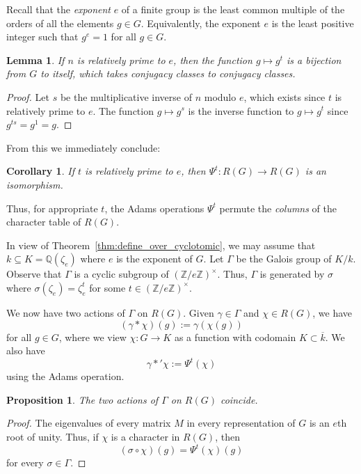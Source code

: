 \documentclass[12pt]{article}
\theoremstyle{plain}
\newtheorem{lemma}[theorem]{Lemma}
\newtheorem{proposition}[theorem]{Proposition}
\newtheorem{corollary}[theorem]{Corollary}
\theoremstyle{definition}
\theoremstyle{remark}
\numberwithin{equation}{section}
\begin{document}
Recall that the \emph{exponent} $e$ of a finite group is the least common multiple
of the orders of all the elements $g \in G$.
Equivalently, the exponent $e$ is the least positive integer such that
$g^e=1$ for all $g \in G$.

\begin{lemma}
If $n$ is relatively prime to $e$,
then the function $g \mapsto g^t$ is a bijection from $G$ to itself,
which takes conjugacy classes to conjugacy classes.
\end{lemma}

\begin{proof}
Let $s$ be the multiplicative inverse of $n$ modulo $e$,
which exists since $t$ is relatively prime to $e$.
The function $g \mapsto g^s$ is the inverse function to
$g \mapsto g^t$ since $g^{ts}=g^1=g$.
\end{proof}

From this we immediately conclude:

\begin{corollary}
If $t$ is relatively prime to $e$,
then $\Psi^t : R(G) \to R(G)$ is an isomorphism.
\end{corollary}

Thus, for appropriate $t$, the Adams operations $\Psi^t$
permute the \emph{columns} of the character table of $R(G)$.

In view of Theorem~\ref{thm:define_over_cyclotomic},
we may assume that $k \subseteq K=\mathbb{Q}(\zeta_e)$
where $e$ is the exponent of $G$.
Let $\Gamma$ be the Galois group of $K/k$.
Observe that $\Gamma$ is a cyclic subgroup of
$(\mathbb{Z}/e\mathbb{Z})^\times$.
Thus, $\Gamma$ is generated by $\sigma$ where
$\sigma(\zeta_e)=\zeta_e^t$ for some $t \in
(\mathbb{Z}/e\mathbb{Z})^\times$.

We now have two actions of $\Gamma$ on $R(G)$.
Given $\gamma \in \Gamma$ and $\chi \in R(G)$, we have
\[
(\gamma \ast \chi)(g) := \gamma(\chi(g)) 
\]
for all $g \in G$,
where we view $\chi: G \to K$ as a function with codomain $K \subset
\overline{k}$.
We also have
\[
\gamma \ast' \chi := \Psi^t(\chi)
\]
using the Adams operation.

\begin{proposition}
The two actions of $\Gamma$ on $R(G)$ coincide.
\end{proposition} 

\begin{proof}
The eigenvalues of every matrix $M$ in every representation of $G$ is an
$e$th root of unity.
Thus, if $\chi$ is a character in $R(G)$, then
\[
(\sigma \circ \chi)(g) = \Psi^t(\chi)(g)
\] 
for every $\sigma \in \Gamma$.
\end{proof}
\end{document}
